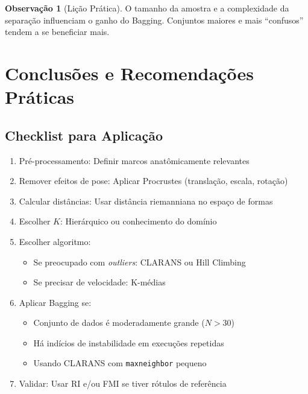 \documentclass[12pt,a4paper]{article}
\theoremstyle{definition}
\newtheorem{observacao}{Observação}[section]
\begin{document}
\begin{observacao}[Lição Prática]
O tamanho da amostra e a complexidade da separação influenciam o ganho do Bagging. Conjuntos maiores e mais ``confusos'' tendem a se beneficiar mais.
\end{observacao}

\section{Conclusões e Recomendações Práticas}

\subsection{Checklist para Aplicação}

\begin{enumerate}[leftmargin=*]
    \item[\checkmark] Pré-processamento: Definir marcos anatômicamente relevantes
    \item[\checkmark] Remover efeitos de pose: Aplicar Procrustes (translação, escala, rotação)
    \item[\checkmark] Calcular distâncias: Usar distância riemanniana no espaço de formas
    \item[\checkmark] Escolher $K$: Hierárquico ou conhecimento do domínio
    \item[\checkmark] Escolher algoritmo:
    \begin{itemize}
        \item Se preocupado com \textit{outliers}: CLARANS ou Hill Climbing
        \item Se precisar de velocidade: K-médias
    \end{itemize}
    \item[\checkmark] Aplicar Bagging se:
    \begin{itemize}
        \item Conjunto de dados é moderadamente grande ($N > 30$)
        \item Há indícios de instabilidade em execuções repetidas
        \item Usando CLARANS com \texttt{maxneighbor} pequeno
    \end{itemize}
    \item[\checkmark] Validar: Usar RI e/ou FMI se tiver rótulos de referência
\end{enumerate}
\end{document}
